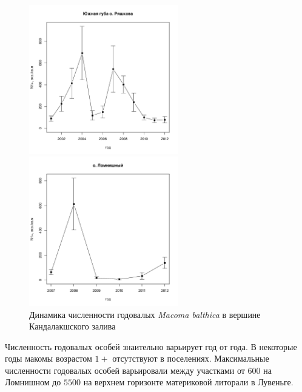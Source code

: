 \begin{figure}[h]
	\begin{minipage}[b]{.46\linewidth}
	\begin{center}
		\includegraphics[width=65mm]{../White_Sea/Ryashkov_YuG/YuG_N_oneyear.pdf}
	\end{center}
	\end{minipage}
%
	\hfil %
%
	\begin{minipage}[b]{.46\linewidth}
	\begin{center}
		\includegraphics[width=65mm]{../White_Sea/Lomnishniy/Lomnishniy_N_oneyear.pdf}
	\end{center}
	\end{minipage}

	\caption{Динамика численности годовалых {\it Macoma balthica} в вершине Кандалакшского залива}
	\label{ris:dynamic_1year_Kandalaksha}
	\end{figure}
Численность годовалых особей знаительно варьирует год от года. 
В некоторые годы макомы возрастом $1+$ отсутствуют в поселениях.
Максимальные численности годовалых особей варьировали между участками от $600$ на Ломнишном до $5500$ на верхнем горизонте материковой литорали в Лувеньге.

